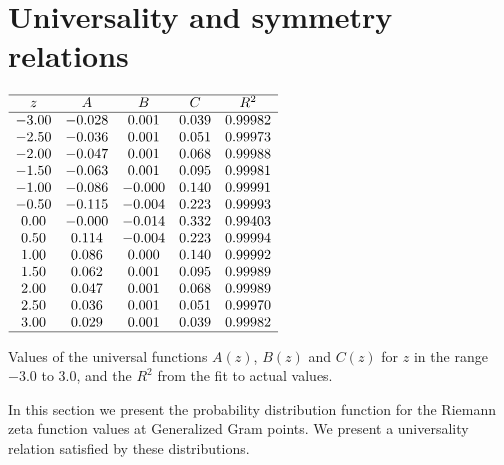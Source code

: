 \documentclass[twoside]{article}
\begin{document}
\section{\label{sec3}Universality and symmetry relations}

\begin{table}
\centering \(\begin{array}{ccccccc}
\hline
     z     & A   &      B      &   C    &R^2\\
\hline
-3.00& -0.028&  0.001&  0.039& 0.99982\\
  -2.50& -0.036&  0.001&  0.051& 0.99973\\
  -2.00& -0.047&  0.001&  0.068& 0.99988\\
  -1.50& -0.063&  0.001&  0.095& 0.99981\\
  -1.00& -0.086& -0.000&  0.140& 0.99991\\
  -0.50& -0.115& -0.004&  0.223& 0.99993\\
   0.00& -0.000& -0.014&  0.332& 0.99403\\
   0.50&  0.114& -0.004&  0.223& 0.99994\\
   1.00&  0.086&  0.000&  0.140& 0.99992\\
   1.50&  0.062&  0.001&  0.095& 0.99989\\
   2.00&  0.047&  0.001&  0.068& 0.99989\\
   2.50&  0.036&  0.001&  0.051& 0.99970\\
   3.00&  0.029&  0.001&  0.039& 0.99982\\
\hline
\end{array}\)
\caption{Values of the universal functions $A(z)$, $B(z)$ and $C(z)$ 
for $z$ in the range $-3.0$ to $3.0$, and the $R^2$ from the fit to actual values.} 
\label{tab:coefficients}
\end{table}

In this section we present the probability distribution function for the Riemann zeta function
values at Generalized Gram points. We present a universality relation satisfied by these distributions.
\end{document}
